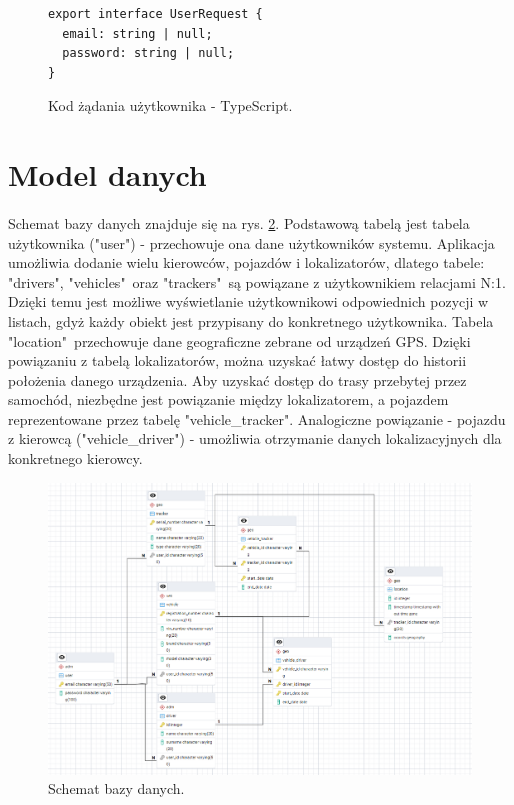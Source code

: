 \begin{figure}
\centering
\begin{lstlisting}
export interface UserRequest {
  email: string | null;
  password: string | null;
}
\end{lstlisting}
\caption{Kod żądania użytkownika - TypeScript.}
\label{fig:kod:dto}
\end{figure}

\section{Model danych}
\paragraph{}
Schemat bazy danych znajduje się na rys. \ref{fig:database}. Podstawową tabelą jest tabela użytkownika ("user") - przechowuje ona dane użytkowników systemu. Aplikacja umożliwia dodanie wielu kierowców, pojazdów i lokalizatorów, dlatego tabele: "drivers", "vehicles"\ oraz "trackers"\ są powiązane z użytkownikiem relacjami N:1. Dzięki temu jest możliwe wyświetlanie użytkownikowi odpowiednich pozycji w listach, gdyż każdy obiekt jest przypisany do konkretnego użytkownika. Tabela "location"\ przechowuje dane geograficzne zebrane od urządzeń GPS. Dzięki powiązaniu z tabelą lokalizatorów, można uzyskać łatwy dostęp do historii położenia danego urządzenia. Aby uzyskać dostęp do trasy przebytej przez samochód, niezbędne jest powiązanie między lokalizatorem, a pojazdem reprezentowane przez tabelę "vehicle\_tracker". Analogiczne powiązanie - pojazdu z kierowcą ("vehicle\_driver") - umożliwia otrzymanie danych lokalizacyjnych dla konkretnego kierowcy.

\begin{figure}
	\centering
	\includegraphics[width=1\textwidth]{./graf/database.png}
	\caption{Schemat bazy danych.}
	\label{fig:database}
\end{figure}

